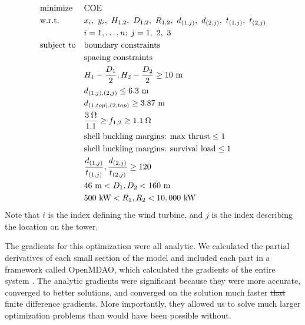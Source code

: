 \documentclass[WESD, manuscript]{copernicus}
\providecommand{\DIFadd}[1]{{\protect\color{blue}\uwave{#1}}} %
\providecommand{\DIFdel}[1]{{\protect\color{red}\sout{#1}}}                      %
\providecommand{\DIFaddbegin}{} %
\providecommand{\DIFaddend}{} %
\providecommand{\DIFdelbegin}{} %
\providecommand{\DIFdelend}{} %
\begin{document}
\begin{equation}
\DIFdelend \DIFaddbegin \begin{aligned}
				& \text{minimize}
					& & \text{COE} \\
                & \text{w.r.t.} 
                	&& x_i,~ y_i,~ H_{1,2},~ D_{1,2},~ R_{1,2},~ d_{(1,j)},~ d_{(2,j)},~ t_{(1,j)},~t_{(2,j)}\\
                		&&& i = 1, \ldots, n; \; j = 1,~2,~3 \\
				& \text{subject to}
					& & \text{boundary constraints} \\
						&&& \text{spacing constraints} \\
						&&& H_1-\frac{D_1}{2}, H_2-\frac{D_2}{2} \geq 10~ \text{m}\\
                		&&& d_{(1,j),(2,j)} \leq 6.3~ \text{m}\\
                		&&& d_{(1,top),(2,top)} \geq 3.87~ \text{m}\\
						&&& \frac{3\hspace{0.08cm}\Omega}{1.1} \geq f_{1,2} \geq 1.1\hspace{0.08cm}\Omega \\
                		&&& \text{shell buckling margins: max thrust} \leq 1 \\
                        &&& \text{shell buckling margins: survival load} \leq 1 \\
                		&&& \frac{d_{(1,j)}}{t_{(1,j)}},\frac{d_{(2,j)}}{t_{(2,j)}} \geq 120\\
                        &&& 46~ \text{m} < D_1,D_2 < 160~ \text{m}  \\
                        &&& 500~ \text{kW} < R_1,R_2 < 10,000~ \text{kW} \\
			\end{aligned}
		\DIFaddend \end{equation}
%
Note that $i$ is the index defining the wind turbine, and $j$ is the index describing the location on the tower.

        The gradients for this optimization were all analytic. We calculated the partial derivatives of each small section of the model and included each part in a framework called OpenMDAO, which calculated the gradients of the entire system \citep{gray2010openmdao}. The analytic gradients were significant because they were more accurate, converged to better solutions, and converged on the solution much faster \DIFdelbegin \DIFdel{that }\DIFdelend \DIFaddbegin \DIFadd{than }\DIFaddend finite difference gradients. More importantly, they allowed us to solve much larger optimization problems than would have been possible without. 
\end{document}
